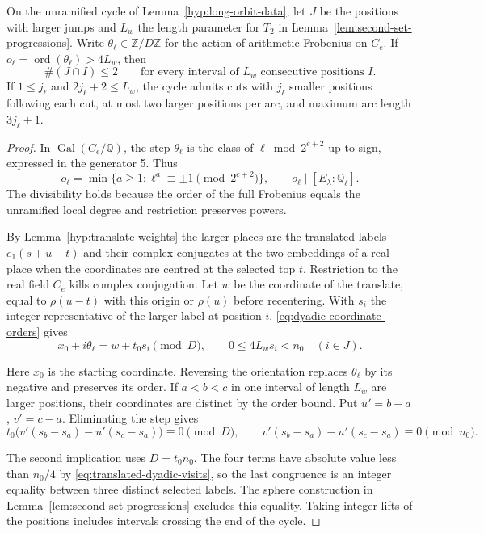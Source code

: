 \begin{auxlemma}\label{lem:long-orbit-spacing}
On the unramified cycle of Lemma~\ref{hyp:long-orbit-data}, let
\(J\) be the positions with larger jumps and \(L_w\) the length
parameter for \(T_2\) in Lemma~\ref{lem:second-set-progressions}.
Write \(\theta_\ell\in\mathbb Z/D\mathbb Z\) for the action of
arithmetic Frobenius on \(C_e\). If
\(o_\ell=\operatorname{ord}(\theta_\ell)>4L_w\), then
\[
 \#(J\cap I)\le2\qquad\text{for every interval of }L_w
                  \text{ consecutive positions }I .
\]
If \(1\le j_\ell\) and \(2j_\ell+2\le L_w\), the cycle admits
cuts with \(j_\ell\) smaller positions following each cut, at most
two larger positions per arc, and maximum arc length \(3j_\ell+1\).
\end{auxlemma}
\begin{proof}
In \(\operatorname{Gal}(C_e/\mathbb Q)\), the step \(\theta_\ell\)
is the class of \(\ell\bmod 2^{e+2}\) up to sign, expressed in the
generator 5. Thus
\[
   o_\ell=\min\{a\ge1:\ell^a\equiv\pm1\pmod{2^{e+2}}\},
    \qquad o_\ell\mid [E_\lambda:\mathbb Q_\ell] .
\]
The divisibility holds because the order of the full Frobenius
equals the unramified local degree and restriction preserves powers.

By Lemma~\ref{hyp:translate-weights} the larger places are the
translated labels \(e_1(s+u-t)\) and their complex conjugates
at the two embeddings of a real place when the coordinates are
centred at the selected top \(t\). Restriction to the real
field \(C_e\) kills complex conjugation. Let \(w\) be the
coordinate of the translate, equal to \(\rho(u-t)\) with this
origin or \(\rho(u)\) before recentering. With \(s_i\) the integer representative of the larger label at
position \(i\), \eqref{eq:dyadic-coordinate-orders} gives
\begin{equation}\label{eq:translated-dyadic-visits}
 x_0+i\theta_\ell=w+t_0 s_i\pmod D,\qquad
                  0\le 4L_w s_i<n_0\quad(i\in J).
\end{equation}

Here \(x_0\) is the starting coordinate. Reversing the orientation
replaces \(\theta_\ell\) by its negative and preserves its order.
If \(a<b<c\) in one interval of length \(L_w\) are larger
positions, their coordinates are distinct by the order bound.
Put \(u'=b-a\), \(v'=c-a\). Eliminating the step gives
\[
 t_0\big(v'(s_b-s_a)-u'(s_c-s_a)\big)\equiv0\pmod D,
 \qquad
 v'(s_b-s_a)-u'(s_c-s_a)\equiv0\pmod{n_0}.
\]

The second implication uses \(D=t_0n_0\). The four terms have
absolute value less than \(n_0/4\) by \eqref{eq:translated-dyadic-visits},
so the last congruence is an integer equality between three
distinct selected labels. The sphere construction in
Lemma~\ref{lem:second-set-progressions} excludes this equality.
Taking integer lifts of the positions includes intervals crossing
the end of the cycle.


\end{proof}

